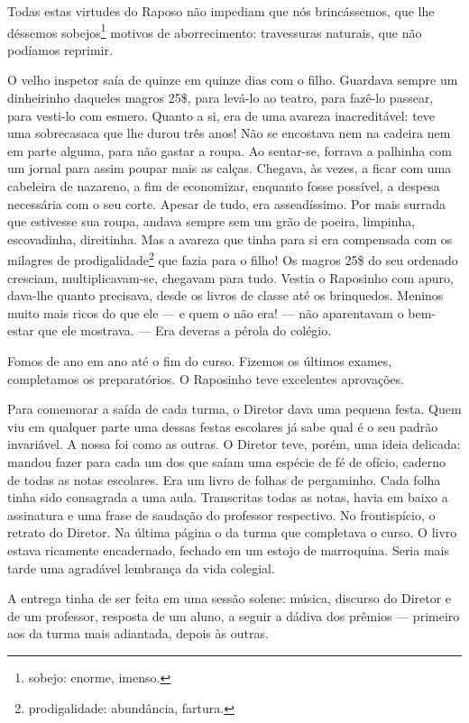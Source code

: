 Todas estas virtudes do Raposo não impediam que nós brincássemos, que
lhe déssemos sobejos\footnote{sobejo: enorme, imenso.} motivos de
aborrecimento: travessuras naturais, que não podíamos reprimir.

O velho inspetor saía de quinze em quinze dias com o filho. Guardava
sempre um dinheirinho daqueles magros 25\$, para levá-lo ao teatro, para
fazê-lo passear, para vesti-lo com esmero. Quanto a si, era de uma
avareza inacreditável: teve uma sobrecasaca que lhe durou três anos! Não
se encostava nem na cadeira nem em parte alguma, para não gastar a
roupa. Ao sentar-se, forrava a palhinha com um jornal para assim poupar
mais as calças. Chegava, às vezes, a ficar com uma cabeleira de
nazareno, a fim de economizar, enquanto fosse possível, a despesa
necessária com o seu corte. Apesar de tudo, era asseadíssimo. Por mais
surrada que estivesse sua roupa, andava sempre sem um grão de poeira,
limpinha, escovadinha, direitinha. Mas a avareza que tinha para si era
compensada com os milagres de prodigalidade\footnote{prodigalidade:
  abundância, fartura.} que fazia para o filho! Os magros 25\$ do seu
ordenado cresciam, multiplicavam-se, chegavam para tudo. Vestia o
Raposinho com apuro, dava-lhe quanto precisava, desde os livros de
classe até os brinquedos. Meninos muito mais ricos do que ele --- e quem
o não era! --- não aparentavam o bem-estar que ele mostrava. --- Era
deveras a pérola do colégio.

Fomos de ano em ano até o fim do curso. Fizemos os últimos exames,
completamos os preparatórios. O Raposinho teve excelentes aprovações.

Para comemorar a saída de cada turma, o Diretor dava uma pequena festa.
Quem viu em qualquer parte uma dessas festas escolares já sabe qual é o
seu padrão invariável. A nossa foi como as outras. O Diretor teve,
porém, uma ideia delicada: mandou fazer para cada um dos que saíam uma
espécie de fé de ofício, caderno de todas as notas escolares. Era um
livro de folhas de pergaminho. Cada folha tinha sido consagrada a uma
aula. Transcritas todas as notas, havia em baixo a assinatura e uma
frase de saudação do professor respectivo. No frontispício, o retrato do
Diretor. Na última página o da turma que completava o curso. O livro
estava ricamente encadernado, fechado em um estojo de marroquina. Seria
mais tarde uma agradável lembrança da vida colegial.

A entrega tinha de ser feita em uma sessão solene: música, discurso do
Diretor e de um professor, resposta de um aluno, a seguir a dádiva dos
prêmios --- primeiro aos da turma mais adiantada, depois às outras.

